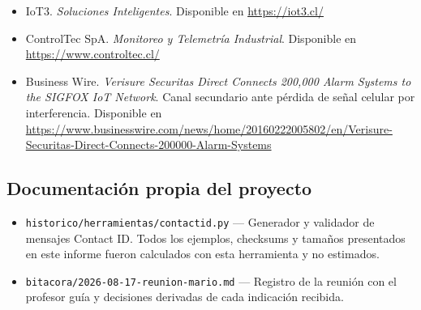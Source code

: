 \begin{itemize}[leftmargin=1.2em]
\item IoT3. \emph{Soluciones Inteligentes}. Disponible en \url{https://iot3.cl/}

\item ControlTec SpA. \emph{Monitoreo y Telemetría Industrial}. Disponible en
\url{https://www.controltec.cl/}

\item Business Wire. \emph{Verisure Securitas Direct Connects 200,000 Alarm Systems to the SIGFOX IoT
Network}. Canal secundario ante pérdida de señal celular por interferencia. Disponible en
\url{https://www.businesswire.com/news/home/20160222005802/en/Verisure-Securitas-Direct-Connects-200000-Alarm-Systems}
\end{itemize}

\subsection*{Documentación propia del proyecto}

\begin{itemize}[leftmargin=1.2em]
\item \texttt{historico/herramientas/contactid.py} --- Generador y validador de mensajes Contact ID.
Todos los ejemplos, checksums y tamaños presentados en este informe fueron calculados con esta
herramienta y no estimados.

\item \texttt{bitacora/2026-08-17-reunion-mario.md} --- Registro de la reunión con el profesor guía y
decisiones derivadas de cada indicación recibida.
\end{itemize}
